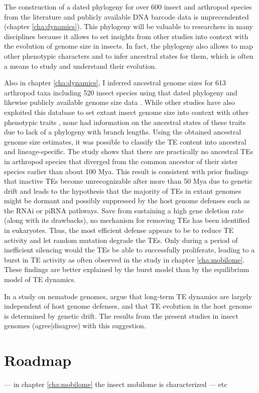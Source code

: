The construction of a dated phylogeny for over 600 insect and arthropod
species from the literature and publicly available DNA barcode data is
unprecendented (chapter \ref{cha:dynamics}). This phylogeny will be
valuable to researchers in many disciplines because it allows to set
insights from other studies into context with the evolution of genome
size in insects.  In fact, the phylogeny also allows to map other
phenotypic characters and to infer ancestral states for them, which is
often a means to study and understand their evolution.

Also in chapter \ref{cha:dynamics}, I inferred ancestral genome sizes
for 613 arthropod taxa including 520 insect species using that dated
phylogeny and likewise publicly available genome size data
\citep{Gregory2018}. While other studies have also exploited this
database to set extant insect genome size into context with other
phenotypic traits \citep{Alfsnes2017, Gregory2011}, none had information
on the ancestral states of these traits due to lack of a phylogeny with
branch lengths. Using the obtained ancestral genome size estimates, it
was possible to classify the TE content into ancestral and
lineage-specific. The study shows that there are practically no
ancestral TEs in arthropod species that diverged from the common
ancestor of their sister species earlier than about 100 Mya. This result
is consistent with prior findings that inactive TEs become
unrecognizable after more than 50 Mya due to genetic drift
\citep{Shedlock2000} and leads to the hypothesis that the majority of
TEs in extant genomes might be dormant and possibly suppressed by the
host genome defenses such as the RNAi or piRNA pathways. Save from
sustaining a high gene deletion rate (along with its drawbacks), no
mechanism for removing TEs has been identified in eukaryotes. Thus, the
most efficient defense appears to be to reduce TE activity and let
random mutation degrade the TEs.  Only during a period of inefficient
silencing would the TEs be able to successfully proliferate, leading to
a burst in TE activity as often observed in the study in chapter
\ref{cha:mobilome}. These findings are better explained by the burst
model than by the equilibrium model of TE dynamics.

In a study on nematode genomes, \citet{Szitenberg2016} argue that
long-term TE dynamics are largely independent of host genome defenses,
and that TE evolution in the host genome is determined by genetic drift.
The results from the present studies in insect genomes (agree|disagree)
with this suggestion. 

\section{Roadmap}

  --- in chapter
\ref{cha:mobilome} the insect mobilome is characterized --- etc
